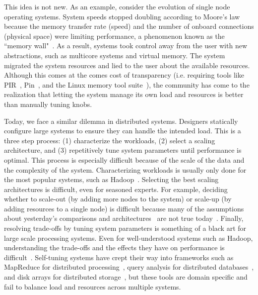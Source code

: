 This idea is not new. As an example, consider the evolution of single node
operating systems. System speeds stopped doubling according to Moore's law
because the memory transfer rate (speed) and the number of onboard connections
(physical space) were limiting performance, a phenomenon known as the ``memory
wall"~\cite{wulf:sigarch1995-memory-wall}. As a result, systems took control
away from the user with new abstractions, such as multicore systems and virtual
memory. The system migrated the system resources and lied to the user about the
available resources. Although this comes at the comes cost of transparency
(i.e. requiring tools like PIR~\cite{olschanowsky:ICPPW2010-PIR},
Pin~\cite{luk:PLDI2005-pin}, and the Linux memory tool
suite~\cite{movall:atec2005-physical}), the community has come to the
realization that letting the system manage its own load and resources is better
than manually tuning knobs. 

Today, we face a similar dilemma in distributed systems. Designers statically
configure large systems to ensure they can handle the intended load. This is a
three step process: (1) characterize the workloads, (2) select a scaling
architecture, and (3) repetitively tune system parameters until performance is
optimal. This process is especially difficult because of the scale of the data
and the complexity of the system. Characterizing workloads is usually only done
for the most popular systems, such as
Hadoop~\cite{chen:2012ccpe-distributed-db,chen:2012vldb-cross-industry,chen:2011mascots-suites,huang:icde2010-hibench}.
Selecting the best scaling architectures is difficult, even for seasoned
experts. For example, deciding whether to scale-out (by adding more nodes to
the system) or scale-up (by adding resources to a single node) is difficult
because many of the assumptions about yesterday's comparisons and
architectures~\cite{michael:2007pdps-scale-up-x-scale-out,talkington:2002journal-scaling,wisniewski:2007europar-commercial-scale-out}
are not true
today~\cite{appuswamy:socc2013-hadoop-vs-single-node,rowstron:hotcdp2012-hadoop-vs-single-node,sevilla:discs2013-framework,sevilla:lspp2014-supmr}.
Finally, resolving trade-offs by tuning system parameters is something of a
black art for large scale processing systems. Even for well-understood systems
such as Hadoop, understanding the trade-offs and the effects they have on
performance is
difficult~\cite{herodotou:cidr2011-starfish,wang:mascots2009-mrperf}.
Self-tuning systems have crept their way into frameworks such as MapReduce for
distributed processing~\cite{herodotou:cidr2011-starfish}, query analysis for
distributed databases~\cite{lefevre:danac2013-evolutionary-analytics}, and disk
arrays for distributed storage~\cite{anderson:fast2001-hippodrome}, but these
tools are domain specific and fail to balance load and resources across
multiple systems. 

